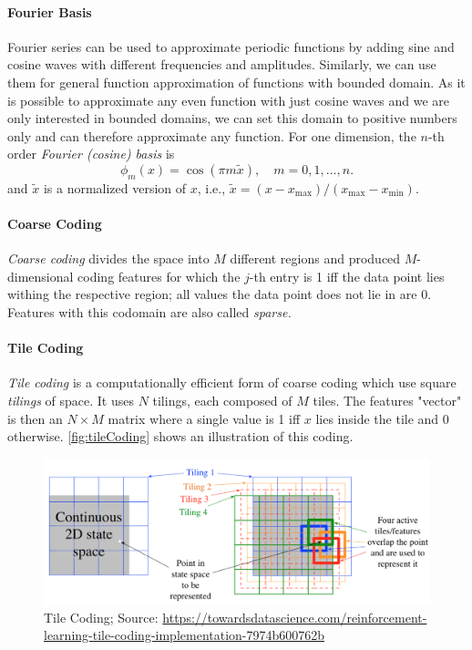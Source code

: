 			\paragraph{Fourier Basis}
				Fourier series can be used to approximate periodic functions by adding sine and cosine waves with different frequencies and amplitudes. Similarly, we can use them for general function approximation of functions with bounded domain. As it is possible to approximate any even function with just cosine waves and we are only interested in bounded domains, we can set this domain to positive numbers only and can therefore approximate any function. For one dimension, the \(n\)-th order \emph{Fourier (cosine) basis} is
				\begin{equation}
					\phi_m(x) = \cos(\pi m \tilde{x}),\quad m = 0, 1, \dots, n.
				\end{equation}
				and \( \tilde{x} \) is a normalized version of \(x\), i.e., \( \tilde{x} = (x - x_\mathrm{max}) / (x_\mathrm{max} - x_\mathrm{min}) \).

			\paragraph{Coarse Coding}
				\emph{Coarse coding} divides the space into \(M\) different regions and produced \(M\)-dimensional coding features for which the \(j\)-th entry is \num{1} iff the data point lies withing the respective region; all values the data point does not lie in are \num{0}. Features with this codomain are also called \emph{sparse.}

			\paragraph{Tile Coding}
				\emph{Tile coding} is a computationally efficient form of coarse coding which use square \emph{tilings} of space. It uses \(N\) tilings, each composed of \(M\) tiles. The features "vector" is then an \(N \times M\) matrix where a single value is \num{1} iff \(x\) lies inside the tile and \num{0} otherwise. \autoref{fig:tileCoding} shows an illustration of this coding.

				\begin{figure}
					\centering
					\includegraphics[width=0.9\linewidth]{figures/tile-coding}
					\caption[Tile Coding]{Tile Coding; Source: {\small \url{https://towardsdatascience.com/reinforcement-learning-tile-coding-implementation-7974b600762b}}}
					\label{fig:tileCoding}
				\end{figure}

